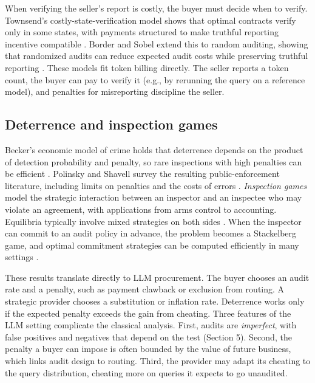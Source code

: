 When verifying the seller's report is costly, the buyer must decide when to verify. Townsend's costly-state-verification model shows that optimal contracts verify only in some states, with payments structured to make truthful reporting incentive compatible \cite{townsend1979csv}. Border and Sobel extend this to random auditing, showing that randomized audits can reduce expected audit costs while preserving truthful reporting \cite{border1987samurai}. These models fit token billing directly. The seller reports a token count, the buyer can pay to verify it (e.g., by rerunning the query on a reference model), and penalties for misreporting discipline the seller.

\subsection{Deterrence and inspection games}\label{deterrence-and-inspection-games}

Becker's economic model of crime holds that deterrence depends on the product of detection probability and penalty, so rare inspections with high penalties can be efficient \cite{becker1968crime}. Polinsky and Shavell survey the resulting public-enforcement literature, including limits on penalties and the costs of errors \cite{polinsky2000enforcement}. \emph{Inspection games} model the strategic interaction between an inspector and an inspectee who may violate an agreement, with applications from arms control to accounting. Equilibria typically involve mixed strategies on both sides \cite{avenhaus2002inspection}. When the inspector can commit to an audit policy in advance, the problem becomes a Stackelberg game, and optimal commitment strategies can be computed efficiently in many settings \cite{conitzer2006commit}.

These results translate directly to LLM procurement. The buyer chooses an audit rate and a penalty, such as payment clawback or exclusion from routing. A strategic provider chooses a substitution or inflation rate. Deterrence works only if the expected penalty exceeds the gain from cheating. Three features of the LLM setting complicate the classical analysis. First, audits are \emph{imperfect}, with false positives and negatives that depend on the test (Section 5). Second, the penalty a buyer can impose is often bounded by the value of future business, which links audit design to routing. Third, the provider may adapt its cheating to the query distribution, cheating more on queries it expects to go unaudited.

